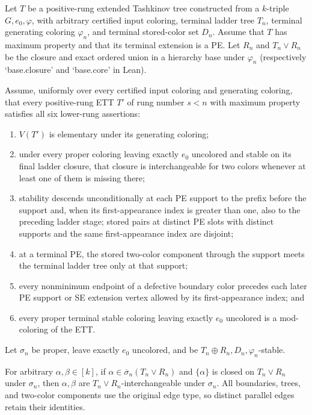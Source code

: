 \begin{lemma}
Let $T$ be a positive-rung extended Tashkinov tree constructed from a
$k$-triple $G,e_0,\varphi$, with arbitrary certified input coloring,
terminal ladder tree $T_n$, terminal generating coloring $\varphi_n$,
and terminal stored-color set $D_n$.  Assume that $T$ has maximum
property and that its terminal extension is a PE.  Let $R_n$ and
$T_n\vee R_n$ be the closure and exact ordered union in a hierarchy
base under $\varphi_n$ (respectively `base.closure' and `base.core'
in Lean).

Assume, uniformly over every certified input coloring and generating
coloring, that every positive-rung ETT $T'$ of rung number $s<n$ with
maximum property satisfies all six lower-rung assertions:
\begin{enumerate}
\item $V(T')$ is elementary under its generating coloring;
\item under every proper coloring leaving exactly $e_0$ uncolored and
stable on its final ladder closure, that closure is interchangeable for
two colors whenever at least one of them is missing there;
\item stability descends unconditionally at each PE support to the prefix before the
support and, when its first-appearance index is greater than one, also to
the preceding ladder stage; stored pairs at
distinct PE slots with distinct supports and the same first-appearance
index are disjoint;
\item at a terminal PE, the stored two-color component through the
support meets the terminal ladder tree only at that support;
\item every nonminimum endpoint of a defective boundary color precedes
each later PE support or SE extension vertex allowed by its
first-appearance index; and
\item every proper terminal stable coloring leaving exactly $e_0$
uncolored is a mod-coloring of the ETT.
\end{enumerate}

Let $\sigma_n$ be proper, leave exactly $e_0$ uncolored, and be
$T_n\oplus R_n,D_n,\varphi_n$-stable.

For arbitrary $\alpha,\beta\in[k]$, if
$\alpha\in\overline\sigma_n(T_n\vee R_n)$ and $\{\alpha\}$ is
closed on $T_n\vee R_n$ under $\sigma_n$, then $\alpha,\beta$ are
$T_n\vee R_n$-interchangeable under $\sigma_n$.
All boundaries, trees, and two-color components use the original edge
type, so distinct parallel edges retain their identities.
\end{lemma}
